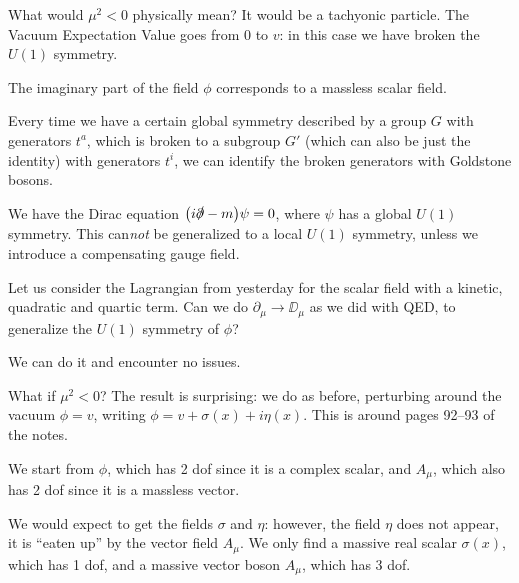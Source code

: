 \documentclass[main.tex]{subfiles}
\begin{document}



What would \(\mu^2<0\) physically mean? It would be a tachyonic particle. The Vacuum Expectation Value goes from 0 to \(v\): in this case we have broken the \(U(1)\) symmetry.

The imaginary part of the field \(\phi \) corresponds to a massless scalar field.

Every time we have a certain global symmetry described by a group \(G\) with generators \(t^{a}\), which is broken to a subgroup \(G'\) (which can also be just the identity) with generators \(t^{i}\), we can identify the broken generators with Goldstone bosons.

We have the Dirac equation \(\qty(i \slashed{\partial} - m) \psi =0\), where \(\psi \) has a global \(U(1)\) symmetry. 
This can\emph{not} be generalized to a local \(U(1)\) symmetry, unless we introduce a compensating gauge field.

Let us consider the Lagrangian from yesterday for the scalar field with a kinetic, quadratic and quartic term. Can we do \(\partial_{\mu } \to \DD_{\mu }\) as we did with QED, to generalize the \(U(1)\) symmetry of \(\phi \)?

We can do it and encounter no issues. 

What if \(\mu^2<0\)? The result is surprising: we do as before, perturbing around the vacuum \(\phi = v\), writing \(\phi = v + \sigma (x) + i \eta (x)\). 
This is around pages 92--93 of the notes.

We start from \(\phi \), which has 2 dof since it is a complex scalar, and \(A_{\mu }\), which also has 2 dof since it is a massless vector. 

We would expect to get the fields \(\sigma \) and \(\eta \): however, the field \(\eta \) does not appear, it is ``eaten up'' by the vector field \(A_{\mu }\).
We only find a massive real scalar \(\sigma (x)\), which has 1 dof, and a massive vector boson \(A_{\mu }\), which has 3 dof.
\end{document}

